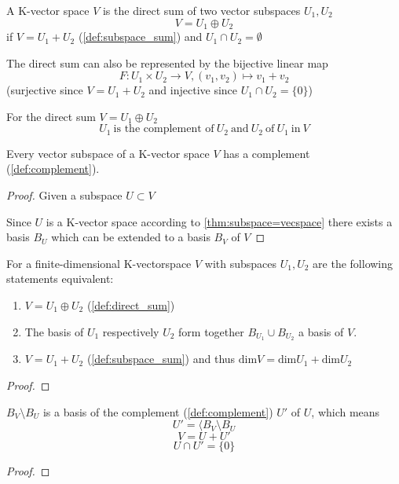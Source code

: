 \begin{definition}\label{def:direct_sum}
   A K-vector space \(V\) is the direct sum of two vector subspaces \(U_1, U_2\)
   \[V = U_1 \oplus U_2\]
   if \(V = U_1 + U_2\) (\ref{def:subspace_sum}) and \(U_1 \cap U_2 = \emptyset\)
\end{definition}
\begin{remark}
   The direct sum can also be represented by the bijective linear map
   \[F: U_1 \times U_2 \to V, (v_1, v_2) \mapsto v_1 + v_2\]
   (surjective since \(V = U_1 + U_2\) and injective since \(U_1 \cap U_2 = \{0\}\))
\end{remark}

\begin{definition}\label{def:complement}
   For the direct sum \(V = U_1 \oplus U_2\)
   \[U_1~\text{is the complement of}~U_2~\text{and}~U_2~\text{of}~U_1~\text{in}~V\]
\end{definition}

\begin{lemma}
   Every vector subspace of a K-vector space \(V\) has a complement (\ref{def:complement}).
\end{lemma}
\begin{proof}
   Given a subspace \(U \subset V\)

   Since \(U\) is a K-vector space according to \cref{thm:subspace=vecspace} there exists a basis \(B_{U}\) which can be extended to a basis \(B_{V}\) of \(V\)
\end{proof}

\begin{theorem}[Direct Sum = Subspace Sum]
   For a finite-dimensional K-vectorspace \(V\) with subspaces \(U_1, U_2\) are the following statements equivalent:
   \begin{enumerate}
      \item \(V = U_1 \oplus U_2\) (\ref{def:direct_sum})
      \item The basis of \(U_1\) respectively \(U_2\) form together \(B_{U_1} \cup B_{U_2}\) a basis of \(V\).
      \item \(V = U_1 + U_2\) (\ref{def:subspace_sum}) and thus \(\text{dim}V = \text{dim}U_1 + \text{dim}U_2\)
   \end{enumerate}
\end{theorem}
\begin{proof}
\end{proof}

\begin{corollary}
   \(B_{V} \setminus B_{U}\) is a basis of the complement (\ref{def:complement}) \(U'\) of \(U\), which means
   \[U' = \langle B_{V} \setminus B_{U}\]
   \[V = U + U'\]
   \[U \cap U' = \{0\}\]
\end{corollary}
\begin{proof}
\end{proof}


